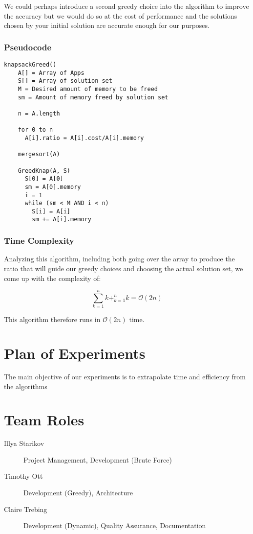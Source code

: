 \documentclass{article}
\begin{document}
We could perhaps introduce a second greedy choice into the algorithm to improve the accuracy but we would do so at the cost of performance and the solutions chosen by your initial solution are accurate enough for our purposes.

\subsubsection{Pseudocode}
\begin{lstlisting}[mathescape]
knapsackGreed()
    A[] = Array of Apps
    S[] = Array of solution set
    M = Desired amount of memory to be freed
    sm = Amount of memory freed by solution set

    n = A.length

    for 0 to n
      A[i].ratio = A[i].cost/A[i].memory

    mergesort(A)

    GreedKnap(A, S)
      S[0] = A[0]
      sm = A[0].memory
      i = 1
      while (sm < M AND i < n)
        S[i] = A[i]
        sm += A[i].memory
\end{lstlisting}

\subsubsection{Time Complexity}
Analyzing this algorithm, including both going over the array to produce the ratio that will guide our greedy choices and choosing the actual solution set, we come up with the complexity of:

\begin{equation}
    \sum _{k = 1} ^{n} k + _{k = 1} ^{n} k = \mathcal{O}(2n)
\end{equation}

This algorithm therefore runs in $\mathcal{O}(2n)$ time.

\section{Plan of Experiments}
The main objective of our experiments is to extrapolate time and efficiency from the algorithms

\section{Team Roles}
\begin{description}
    \item [Illya Starikov] Project Management, Development (Brute Force)
    \item [Timothy Ott] Development (Greedy), Architecture
    \item [Claire Trebing] Development (Dynamic), Quality Assurance,  Documentation
\end{description}
\end{document}
